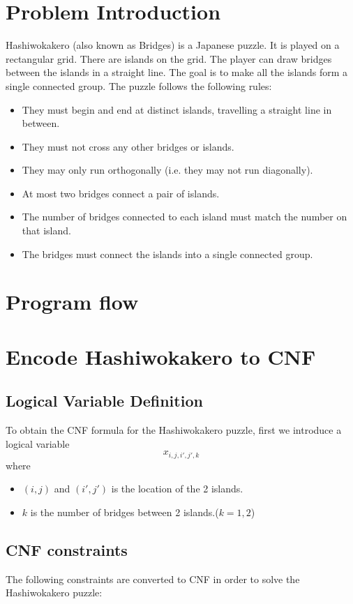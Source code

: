 \documentclass[12pt, a4paper]{article}
\begin{document}
\section{Problem Introduction}
Hashiwokakero (also known as Bridges) is a Japanese puzzle. It is played on a rectangular grid. There are islands on the grid. The player can draw bridges between the islands in a straight line. The goal is to make all the islands form a single connected group. The puzzle follows the following rules:
\begin{itemize}
    \item They must begin and end at distinct islands, travelling a straight line in between.
    \item They must not cross any other bridges or islands.
    \item They may only run orthogonally (i.e. they may not run diagonally).
    \item At most two bridges connect a pair of islands.
    \item The number of bridges connected to each island must match the number on that island.
    \item The bridges must connect the islands into a single connected group.
\end{itemize}
\section{Program flow}
\section{Encode Hashiwokakero to CNF}
\subsection{Logical Variable Definition}
To obtain the CNF formula for the Hashiwokakero puzzle, first we introduce a logical variable \\
\[ x_{i,j,i',j',k} \]
where 
\begin{itemize}
  \item $(i,j)$ and $(i',j')$ is the location of the 2 islands.
  \item $k$ is the number of bridges between 2 islands.($k=1,2$)
\end{itemize}
\subsection{CNF constraints}
The following constraints are converted to CNF in order to solve the Hashiwokakero puzzle:
\end{document}
